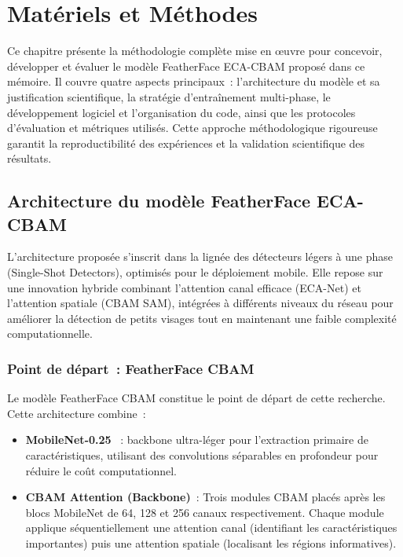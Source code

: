 \chapter{Matériels et Méthodes}
\begin{onehalfspace}

\hspace{0.65 cm}Ce chapitre présente la méthodologie complète mise en œuvre pour concevoir, développer et évaluer le modèle FeatherFace ECA-CBAM proposé dans ce mémoire. Il couvre quatre aspects principaux~: l'architecture du modèle et sa justification scientifique, la stratégie d'entraînement multi-phase, le développement logiciel et l'organisation du code, ainsi que les protocoles d'évaluation et métriques utilisés. Cette approche méthodologique rigoureuse garantit la reproductibilité des expériences et la validation scientifique des résultats.

\section{Architecture du modèle FeatherFace ECA-CBAM}

\hspace{0.65 cm}L'architecture proposée s'inscrit dans la lignée des détecteurs légers à une phase (Single-Shot Detectors), optimisés pour le déploiement mobile. Elle repose sur une innovation hybride combinant l'attention canal efficace (ECA-Net) et l'attention spatiale (CBAM SAM), intégrées à différents niveaux du réseau pour améliorer la détection de petits visages tout en maintenant une faible complexité computationnelle.

\subsection{Point de départ~: FeatherFace CBAM}

\hspace{0.65 cm}Le modèle FeatherFace CBAM \cite{Kim2025FeatherFace} constitue le point de départ de cette recherche. Cette architecture combine~:

\begin{itemize}
\item \textbf{MobileNet-0.25} \cite{Sandler2018MobileNetV2}~: backbone ultra-léger pour l'extraction primaire de caractéristiques, utilisant des convolutions séparables en profondeur pour réduire le coût computationnel.

\item \textbf{CBAM Attention (Backbone)}~: Trois modules CBAM \cite{Woo2018CBAM} placés après les blocs MobileNet de 64, 128 et 256 canaux respectivement. Chaque module applique séquentiellement une attention canal (identifiant les caractéristiques importantes) puis une attention spatiale (localisant les régions informatives).


\end{itemize}
\end{onehalfspace}

